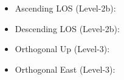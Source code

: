 \documentclass[11pt,a4paper]{article}
\begin{document}
\begin{itemize}
    \item Ascending LOS (Level-2b): \texttt{}
    \item Descending LOS (Level-2b): \texttt{}
    \item Orthogonal Up (Level-3): \texttt{}
    \item Orthogonal East (Level-3): \texttt{}
\end{itemize}


\setlength{\bibitemsep}{1em}
\printbibliography
\end{document}
